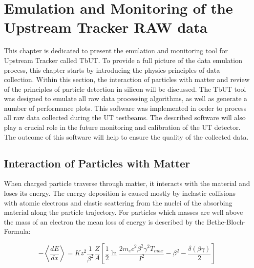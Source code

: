 \chapter{Emulation and Monitoring of the Upstream Tracker RAW data}
\label{chapter:tbut}

This chapter is dedicated to present the emulation and monitoring tool for Upstream Tracker called TbUT.
To provide a full picture of the data emulation process, this chapter starts by introducing the physics principles of data collection. Within this section, the interaction of particles with matter and review of the principles of particle detection in silicon will be discussed.    
The TbUT tool was designed to emulate all raw data processing algorithms, as well as generate a number of performance plots. This software was implemented in order to process all raw data collected during the UT testbeams. The described software will also play a crucial role in the future monitoring and calibration of the UT detector. The outcome of this software will help to ensure the quality of the collected data. 


\section{Interaction of Particles with Matter}
\label{sec:Interaction}
When charged particle traverse through matter, it interacts with the material and loses its energy. The energy deposition is caused mostly by inelastic collisions with atomic electrons and elastic scattering from the nuclei of the absorbing material along the particle trajectory. For particles which masses are well above the mass of an electron the mean loss of energy is described by the Bethe-Bloch-Formula: 

\begin{equation}
\label{eq:Bethe_bloh}
  -\left< \frac{dE}{dx} \right> = K z^2 \frac{1}{\beta^2} \frac{Z}{A} 
  \left[ \frac{1}{2} \ln \frac{2m_e c^2 \beta^2 \gamma^2 T_{max}}{I^2} - \beta^2 - \frac{\delta(\beta \gamma)}{2}
  \right]  
\end{equation}

